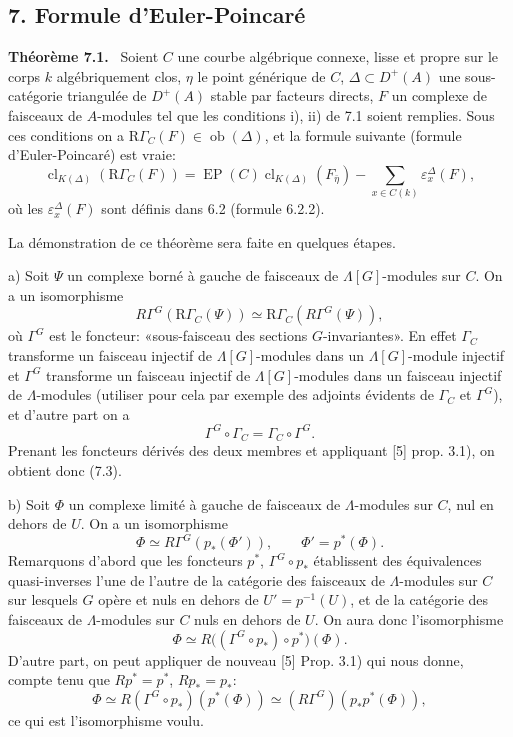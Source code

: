 \documentclass[11pt]{article}
\newenvironment{statement}[1]{\par\medskip\noindent\textbf{#1.}\ }{\par\medskip}
\providecommand{\EP}{\operatorname{EP}}
\providecommand{\Ob}{\operatorname{ob}}
\providecommand{\Ob}{\operatorname{ob}}
\providecommand{\EP}{\operatorname{EP}}
\providecommand{\Ob}{\operatorname{Ob}}
\providecommand{\clK}[1]{\operatorname{cl}_{K(#1)}}
\providecommand{\RG}{\mathrm R\Gamma}
\providecommand{\Ob}{\operatorname{ob}}
\begin{document}
\subsection*{7. Formule d'Euler-Poincaré}

\begin{statement}{Théorème 7.1}
Soient $C$ une courbe algébrique connexe, lisse et propre sur le corps $k$ algébriquement clos, $\eta$ le point générique de $C$, $\Delta\subset D^+(A)$ une sous-catégorie triangulée de $D^+(A)$ stable par facteurs directs, $F$ un complexe de faisceaux de $A$-modules tel que les conditions i), ii) de 7.1 soient remplies. Sous ces conditions on a $\RG_C(F)\in\Ob(\Delta)$, et la formule suivante (formule d'Euler-Poincaré) est vraie:
\[
\clK{\Delta}(\RG_C(F))
=
\EP(C)\clK{\Delta}(F_{\bar\eta})
-\sum_{x\in C(k)}\varepsilon_x^\Delta(F),
\tag{7.2}
\]
où les $\varepsilon_x^\Delta(F)$ sont définis dans 6.2 (formule 6.2.2).
\end{statement}

La démonstration de ce théorème sera faite en quelques étapes.

a) Soit $\Psi$ un complexe borné à gauche de faisceaux de $\Lambda[G]$-modules sur $C$. On a un isomorphisme
\[
R\Gamma^G(\RG_C(\Psi))\simeq\RG_C(R\Gamma^G(\Psi)),
\tag{7.3}
\]
où $\Gamma^G$ est le foncteur: «sous-faisceau des sections $G$-invariantes». En effet $\Gamma_C$ transforme un faisceau injectif de $\Lambda[G]$-modules dans un $\Lambda[G]$-module injectif et $\Gamma^G$ transforme un faisceau injectif de $\Lambda[G]$-modules dans un faisceau injectif de $\Lambda$-modules (utiliser pour cela par exemple des adjoints évidents de $\Gamma_C$ et $\Gamma^G$), et d'autre part on a
\[
\Gamma^G\circ\Gamma_C=\Gamma_C\circ\Gamma^G.
\]
Prenant les foncteurs dérivés des deux membres et appliquant [5] prop. 3.1), on obtient donc (7.3).

b) Soit $\Phi$ un complexe limité à gauche de faisceaux de $\Lambda$-modules sur $C$, nul en dehors de $U$. On a un isomorphisme
\[
\Phi\simeq R\Gamma^G(p_*(\Phi')),
\qquad \Phi'=p^*(\Phi).
\tag{7.4}
\]
Remarquons d'abord que les foncteurs $p^*$, $\Gamma^G\circ p_*$ établissent des équivalences quasi-inverses l'une de l'autre de la catégorie des faisceaux de $\Lambda$-modules sur $C$ sur lesquels $G$ opère et nuls en dehors de $U'=p^{-1}(U)$, et de la catégorie des faisceaux de $\Lambda$-modules sur $C$ nuls en dehors de $U$. On aura donc l'isomorphisme
\[
\Phi\simeq R\bigl((\Gamma^G\circ p_*)\circ p^*\bigr)(\Phi).
\]
D'autre part, on peut appliquer de nouveau [5] Prop. 3.1) qui nous donne, compte tenu que $Rp^*=p^*$, $Rp_*=p_*$:
\[
\Phi\simeq R(\Gamma^G\circ p_*)(p^*(\Phi))
\simeq (R\Gamma^G)(p_*p^*(\Phi)),
\]
ce qui est l'isomorphisme voulu.
\end{document}
